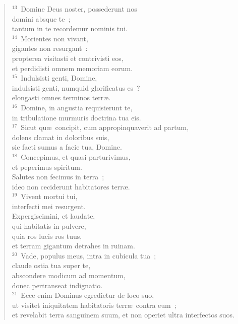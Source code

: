 \begin{verse}
${}^{13}$~Domine Deus noster, possederunt nos\\ domini absque te~;\\ tantum in te recordemur nominis tui.\\
${}^{14}$~Morientes non vivant,\\ gigantes non resurgant~:\\ propterea visitasti et contrivisti eos,\\ et perdidisti omnem memoriam eorum.\\
${}^{15}$~Indulsisti genti, Domine,\\ indulsisti genti, numquid glorificatus es~?\\ elongasti omnes terminos terr\ae .\\
${}^{16}$~Domine, in angustia requisierunt te,\\ in tribulatione murmuris doctrina tua eis.\\
${}^{17}$~Sicut qu\ae\ concipit, cum appropinquaverit ad partum,\\ dolens clamat in doloribus suis,\\ sic facti sumus a facie tua, Domine.\\
${}^{18}$~Concepimus, et quasi parturivimus,\\ et peperimus spiritum.\\ Salutes non fecimus in terra~;\\ ideo non ceciderunt habitatores terr\ae .\\
${}^{19}$~Vivent mortui tui,\\ interfecti mei resurgent.\\ Expergiscimini, et laudate,\\ qui habitatis in pulvere,\\ quia ros lucis ros tuus,\\ et terram gigantum detrahes in ruinam.\\
${}^{20}$~Vade, populus meus, intra in cubicula tua~;\\ claude ostia tua super te,\\ abscondere modicum ad momentum,\\ donec pertranseat indignatio.\\
${}^{21}$~Ecce enim Dominus egredietur de loco suo,\\ ut visitet iniquitatem habitatoris terr\ae\ contra eum~;\\ et revelabit terra sanguinem suum, et non operiet ultra interfectos suos.\end{verse}


